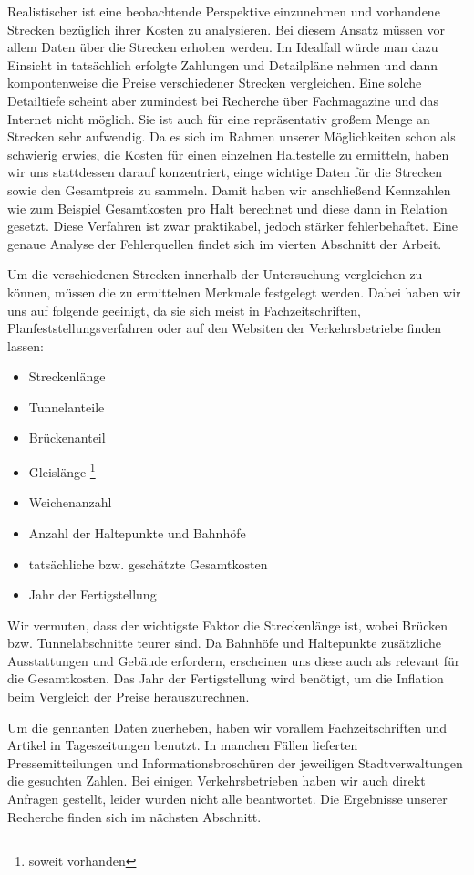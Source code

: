 Realistischer ist eine beobachtende Perspektive einzunehmen und vorhandene
Strecken bezüglich ihrer Kosten zu analysieren. Bei diesem Ansatz müssen vor
allem Daten über die Strecken erhoben werden. Im Idealfall würde man dazu
Einsicht in tatsächlich erfolgte Zahlungen und Detailpläne nehmen und dann
kompontenweise die Preise verschiedener Strecken vergleichen. Eine solche
Detailtiefe scheint aber zumindest bei Recherche über Fachmagazine und das
Internet nicht möglich. Sie ist auch für eine repräsentativ großem Menge an
Strecken sehr aufwendig. Da es sich im Rahmen unserer Möglichkeiten schon als
schwierig erwies, die Kosten für einen einzelnen Haltestelle zu ermitteln, haben
wir uns stattdessen darauf konzentriert, einge wichtige Daten für die Strecken
sowie den Gesamtpreis zu sammeln. Damit haben wir anschließend Kennzahlen wie
zum Beispiel Gesamtkosten pro Halt berechnet und diese dann in Relation
gesetzt. Diese Verfahren ist zwar praktikabel, jedoch stärker fehlerbehaftet. Eine
genaue Analyse der Fehlerquellen findet sich im vierten Abschnitt der Arbeit.

Um die verschiedenen Strecken innerhalb der Untersuchung vergleichen zu können,
müssen die zu ermittelnen Merkmale festgelegt werden. Dabei haben wir uns auf
folgende geeinigt, da sie sich meist in Fachzeitschriften,
Planfeststellungsverfahren oder auf den Websiten der Verkehrsbetriebe finden
lassen:

\begin{itemize}
\item Streckenlänge
\item Tunnelanteile
\item Brückenanteil
\item Gleislänge \footnote{soweit vorhanden}\setcounter{fnnumber}{\thefootnote}
\item Weichenanzahl \footnotemark[\thefnnumber]
\item Anzahl der Haltepunkte und Bahnhöfe
\item tatsächliche bzw. geschätzte Gesamtkosten
\item Jahr der Fertigstellung
\end{itemize}

Wir vermuten, dass der wichtigste Faktor die Streckenlänge ist, wobei Brücken
bzw. Tunnelabschnitte teurer sind. Da Bahnhöfe und Haltepunkte zusätzliche
Ausstattungen und Gebäude erfordern, erscheinen uns diese auch als relevant für
die Gesamtkosten. Das Jahr der Fertigstellung wird benötigt, um die Inflation
beim Vergleich der Preise herauszurechnen.

Um die gennanten Daten zuerheben, haben wir vorallem Fachzeitschriften und
Artikel in Tageszeitungen benutzt. In manchen Fällen lieferten Pressemitteilungen
und Informationsbroschüren der jeweiligen Stadtverwaltungen die gesuchten Zahlen.
Bei einigen Verkehrsbetrieben haben wir auch direkt Anfragen gestellt, leider 
wurden nicht alle beantwortet. Die Ergebnisse unserer Recherche finden sich im 
nächsten Abschnitt.
